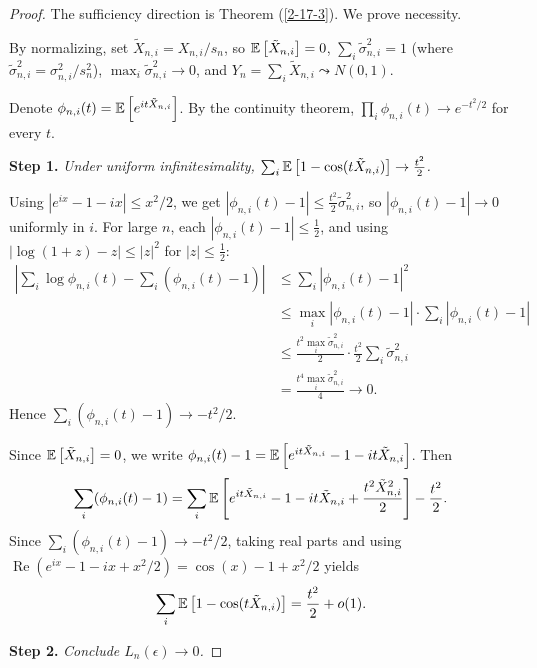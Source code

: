 \begin{proof}
	The sufficiency direction is Theorem (\ref{2-17-3}). We prove necessity.

	By normalizing, set $\tilde{X}_{n,i} = X_{n,i}/s_n$, so $\mathbb{E}\left[\tilde{X}_{n,i}\right] = 0$, $\sum_i \tilde{\sigma}_{n,i}^2 = 1$ (where $\tilde{\sigma}_{n,i}^2 = \sigma_{n,i}^2 / s_n^2$), $\max_i \tilde{\sigma}_{n,i}^2 \to 0$, and $Y_n = \sum_i \tilde{X}_{n,i} \leadsto N(0,1)$.

	Denote $\phi_{n,i}(t) = \mathbb{E}\left[e^{it\tilde{X}_{n,i}}\right]$. By the continuity theorem, $\prod_i \phi_{n,i}(t) \to e^{-t^2/2}$ for every $t$.

	\textbf{Step 1.} \emph{Under uniform infinitesimality, $\sum_i \mathbb{E}\left[1 - \cos(t\tilde{X}_{n,i})\right] \to \frac{t^2}{2}$.}

	Using $|e^{ix}-1-ix| \le x^2/2$, we get $|\phi_{n,i}(t)-1| \le \frac{t^2}{2}\tilde{\sigma}_{n,i}^2$, so $|\phi_{n,i}(t)-1| \to 0$ uniformly in $i$. For large $n$, each $|\phi_{n,i}(t)-1| \le \frac{1}{2}$, and using $|\log(1+z) - z| \le |z|^2$ for $|z| \le \frac{1}{2}$:
	\begin{align*}
		\left|\sum_i \log\phi_{n,i}(t) - \sum_i(\phi_{n,i}(t)-1)\right|
		&\le \sum_i |\phi_{n,i}(t)-1|^2 \\
		&\le \max_i |\phi_{n,i}(t)-1| \cdot \sum_i |\phi_{n,i}(t)-1| \\
		&\le \frac{t^2\max_i \tilde{\sigma}_{n,i}^2}{2} \cdot \frac{t^2}{2} \sum_i \tilde{\sigma}_{n,i}^2 \\
		&= \frac{t^4 \max_i \tilde{\sigma}_{n,i}^2}{4} \to 0.
	\end{align*}
	Hence $\sum_i (\phi_{n,i}(t)-1) \to -t^2/2$.

	Since $\mathbb{E}\left[\tilde{X}_{n,i}\right] = 0$, we write $\phi_{n,i}(t) - 1 = \mathbb{E}\left[e^{it\tilde{X}_{n,i}} - 1 - it\tilde{X}_{n,i}\right]$. Then
	\begin{align*}
		\sum_i (\phi_{n,i}(t)-1) = \sum_i \mathbb{E}\left[e^{it\tilde{X}_{n,i}} - 1 - it\tilde{X}_{n,i} + \frac{t^2\tilde{X}_{n,i}^2}{2}\right] - \frac{t^2}{2}.
	\end{align*}
	Since $\sum_i (\phi_{n,i}(t)-1) \to -t^2/2$, taking real parts and using $\operatorname{Re}(e^{ix}-1-ix+x^2/2) = \cos(x) - 1 + x^2/2$ yields \[
		\sum_i \mathbb{E}\left[1 - \cos(t\tilde{X}_{n,i})\right] = \frac{t^2}{2} + o(1).
	\]

	\textbf{Step 2.} \emph{Conclude $L_n(\epsilon) \to 0$.}


\end{proof}
